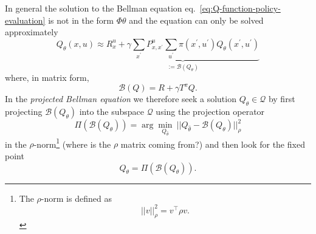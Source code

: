 In general the solution to the Bellman equation eq.~\eqref{eq:Q-function-policy-evaluation} is not in the form $\Phi\theta$ and the equation can only be solved approximately
\begin{equation*}
  Q_\theta(x,u) \approx \underbrace{R_x^u + \gamma\sum_{x^\prime} P_{x,x^\prime}^u \sum_{u^\prime} \pi(x^\prime,u^\prime)Q_\theta(x^\prime,u^\prime)}_{:=\mathcal{B}(Q_\theta)}
\end{equation*}
where, in matrix form,
\begin{equation}
  \label{eq:Q-function-matrix}
  \mathcal{B}(Q) = R + \gamma T^\pi Q.
\end{equation}
In the \emph{projected Bellman equation} we therefore seek a solution $Q_\theta\in \mathcal{Q}$ by first projecting $\mathcal{B}(Q_\theta)$ into the subspace $\mathcal{Q}$ using the projection operator
\begin{equation*}
  \Pi(\mathcal{B}(Q_\theta)) = \arg \min_{Q_{\hat{\theta}}}\ |\!| Q_{\hat{\theta}} - \mathcal{B}(Q_\theta) |\!|_\rho^2
\end{equation*}
in the $\rho$-norm\footnote{The $\rho$-norm is defined as
\begin{equation*}
  |\!|v|\!|_\rho^2 = v^\top \rho v.
\end{equation*}}
(where is the $\rho$ matrix coming from?) and then look for the fixed point
\begin{equation}
  \label{eq:projected-Bellman-equation}
  Q_\theta = \Pi(\mathcal{B}(Q_\theta)).
\end{equation}

